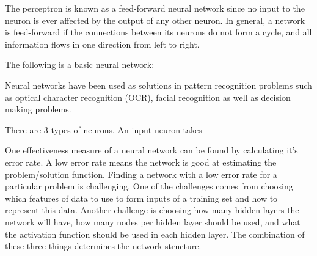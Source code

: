 
The perceptron is known as a feed-forward neural network since no input to the neuron is ever affected by the output of any other neuron. In general, a network is feed-forward if the connections between its neurons do not form a cycle, and all information flows in one direction from left to right.


The following is a basic neural network: 





Neural networks have been used as solutions in pattern recognition problems such as optical character recognition (OCR)\cite{ocr1}\cite{ocr2}, facial recognition\cite{face} as well as decision making problems\cite{decisionMaking1}\cite{decisionMaking2}.



There are 3 types of neurons. An input neuron takes


One effectiveness measure of a neural network can be found by calculating it's error rate. A low error rate means the network is good at estimating the problem/solution function. Finding a network with a low error rate for a particular problem is challenging. One of the challenges comes from choosing which features of data to use to form inputs of a training set and how to represent this data. Another challenge is choosing how many hidden layers the network will have, how many nodes per hidden layer should be used, and what the activation function should be used in each hidden layer. The combination of these three things determines the network structure. 